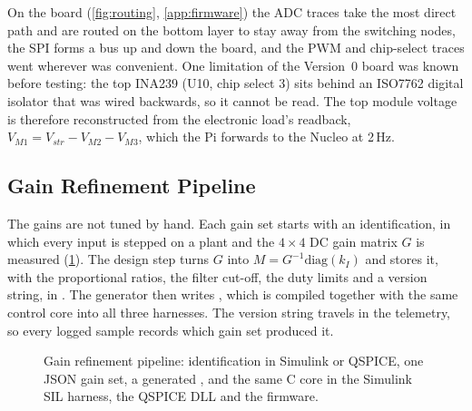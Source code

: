 On the board (\cref{fig:routing}, \cref{app:firmware}) the ADC traces take the most direct path and are routed on the bottom layer to stay away from the switching nodes, the SPI forms a bus up and down the board, and the PWM and chip-select traces went wherever was convenient. One limitation of the Version~0 board was known before testing: the top INA239 (U10, chip select 3) sits behind an ISO7762 digital isolator that was wired backwards, so it cannot be read. The top module voltage is therefore reconstructed from the electronic load's readback, $V_{M1} = V_{str} - V_{M2} - V_{M3}$, which the Pi forwards to the Nucleo at 2\,Hz.

\subsection{Gain Refinement Pipeline}
\label{sec:gainpipe}
The gains are not tuned by hand. Each gain set starts with an identification, in which every input is stepped on a plant and the $4\times4$ DC gain matrix $G$ is measured (\cref{fig:gainpipe}). The design step turns $G$ into $M = G^{-1}\mathrm{diag}(k_I)$ and stores it, with the proportional ratios, the filter cut-off, the duty limits and a version string, in . The generator  then writes , which is compiled together with the same control core into all three harnesses. The version string travels in the telemetry, so every logged sample records which gain set produced it.

\begin{figure}[htbp]
  \centering
  
  \caption[{Gain refinement pipeline}]{Gain refinement pipeline: identification in Simulink or QSPICE, one JSON gain set, a generated , and the same C core in the Simulink SIL harness, the QSPICE DLL and the firmware.}
  \label{fig:gainpipe}
\end{figure}

